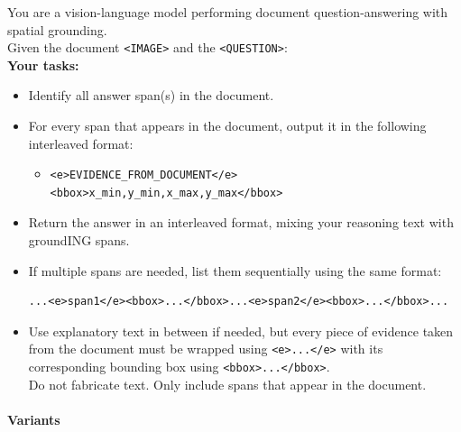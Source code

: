 \begin{tcolorbox}[baseline_prompt_style, title=InternVL3.5 (ft.) and Qwen3-VL (ft.)]

You are a vision-language model performing document question-answering with spatial grounding. \\

Given the document \texttt{<IMAGE>} and the \texttt{<QUESTION>}: \\


\textbf{Your tasks:}
\begin{itemize}[leftmargin=10pt]

    \item Identify all answer span(s) in the document.

    \item For every span that appears in the document, output it in the following interleaved format:
    \begin{itemize}
        \item 
\begin{verbatim}
<e>EVIDENCE_FROM_DOCUMENT</e><bbox>x_min,y_min,x_max,y_max</bbox>
\end{verbatim}
    \end{itemize}

    \item Return the answer in an interleaved format, mixing your reasoning text with groundING spans.
    \item If multiple spans are needed, list them sequentially using the same format:

\begin{verbatim}
...<e>span1</e><bbox>...</bbox>...<e>span2</e><bbox>...</bbox>...
\end{verbatim}

    \item Use explanatory text in between if needed, but every piece of evidence taken from the document must be wrapped using \texttt{<e>...</e>} with its corresponding bounding box using \texttt{<bbox>...</bbox>}. \\
Do not fabricate text. Only include spans that appear in the document.
\end{itemize}
\end{tcolorbox}

\paragraph{\modelName Variants}\mbox{}\\[4pt]

